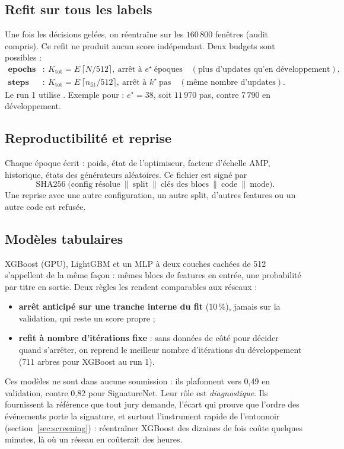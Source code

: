 \subsection{Refit sur tous les labels}
Une fois les décisions gelées, on réentraîne sur les $160\,800$ fenêtres (audit compris). Ce refit ne produit aucun score indépendant. Deux budgets sont possibles :
\begin{align}
\textbf{epochs}&:\ K_{\text{tot}}=E\,\lceil N/512\rceil,\ \text{arrêt à }e^\star\ \text{époques}\quad(\text{plus d'updates qu'en développement}),\\
\textbf{steps}&:\ K_{\text{tot}}=E\,\lceil n_{\text{fit}}/512\rceil,\ \text{arrêt à }k^\star\ \text{pas}\quad(\text{même nombre d'updates}).
\end{align}
Le run 1 utilise . Exemple pour  : $e^\star=38$, soit $11\,970$ pas, contre $7\,790$ en développement.

\subsection{Reproductibilité et reprise}
Chaque époque écrit  : poids, état de l'optimiseur, facteur d'échelle AMP, historique, états des générateurs aléatoires. Ce fichier est signé par
\begin{equation}
\operatorname{SHA256}\big(\text{config résolue}\ \|\ \text{split}\ \|\ \text{clés des blocs}\ \|\ \text{code}\ \|\ \text{mode}\big).
\end{equation}
Une reprise avec une autre configuration, un autre split, d'autres features ou un autre code est refusée.

\subsection{Modèles tabulaires}
XGBoost (GPU), LightGBM et un MLP à deux couches cachées de 512 s'appellent de la même façon : mêmes blocs de features en entrée, une probabilité par titre en sortie. Deux règles les rendent comparables aux réseaux :
\begin{itemize}
\item \textbf{arrêt anticipé sur une tranche interne du fit} (10\,\%), jamais sur la validation, qui reste un score propre ;
\item \textbf{refit à nombre d'itérations fixe} : sans données de côté pour décider quand s'arrêter, on reprend le meilleur nombre d'itérations du développement (711 arbres pour XGBoost au run 1).
\end{itemize}
Ces modèles ne sont dans aucune soumission : ils plafonnent vers 0,49 en validation, contre 0,82 pour SignatureNet. Leur rôle est \emph{diagnostique}. Ils fournissent la référence que tout jury demande, l'écart qui prouve que l'ordre des événements porte la signature, et surtout l'instrument rapide de l'entonnoir (section~\ref{sec:screening}) : réentraîner XGBoost des dizaines de fois coûte quelques minutes, là où un réseau en coûterait des heures.

